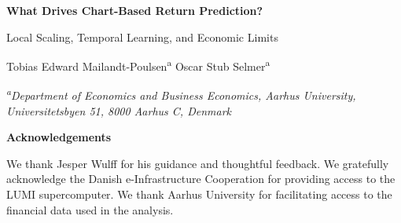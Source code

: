 \documentclass[11pt]{article}
\begin{document}
\begin{titlepage}

\begin{center}
\vspace*{22mm}
{\LARGE\bfseries What Drives Chart-Based Return Prediction?\par
Local Scaling, Temporal Learning, and Economic Limits\par}

\vspace{18mm}
{\large Tobias Edward Mailandt-Poulsen\textsuperscript{a} \quad
Oscar Stub Selmer\textsuperscript{a}\par}

\vspace{7mm}
{\itshape\textsuperscript{a}Department of Economics and Business Economics,
Aarhus University, Universitetsbyen 51, 8000 Aarhus C, Denmark\par}
\end{center}

\vspace{18mm}

\noindent\textbf{Acknowledgements}\par
\noindent We thank Jesper Wulff for his guidance and thoughtful feedback. We
gratefully acknowledge the Danish e-Infrastructure Cooperation for providing
access to the LUMI supercomputer. We thank Aarhus University for facilitating
access to the financial data used in the analysis.
\end{titlepage}
\end{document}
